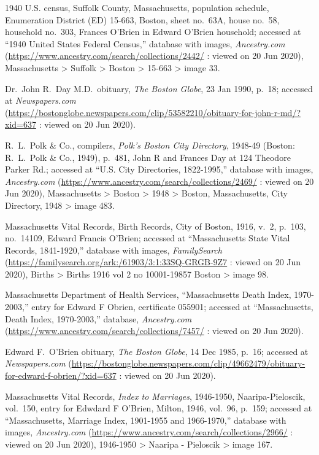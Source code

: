 \begin{thebibliography}{999}
1940 U.S. census, Suffolk County, Massachusetts, population schedule, Enumeration District (ED) 15-663, Boston, sheet no.\ 63A, house no.\ 58, household no.\ 303, Frances O'Brien in Edward O'Brien household; accessed at ``1940 United States Federal Census,'' database with images, \textit{Ancestry.com} (\url{https://www.ancestry.com/search/collections/2442/} : viewed on 20 Jun 2020), Massachusetts > Suffolk > Boston > 15-663 > image 33.

Dr.\ John R.\ Day M.D.\ obituary, \textit{The Boston Globe}, 23 Jan 1990, p.\ 18; accessed at \textit{Newspapers.com} (\url{https://bostonglobe.newspapers.com/clip/53582210/obituary-for-john-r-md/?xid=637} : viewed on 20 Jun 2020).

R.\ L.\ Polk \& Co., compilers, \textit{Polk's Boston City Directory}, 1948-49 (Boston: R.\ L.\ Polk \& Co., 1949), p.\ 481, John R and Frances Day at 124 Theodore Parker Rd.; accessed at ``U.S. City Directories, 1822-1995,'' database with images, \textit{Ancestry.com} (\url{https://www.ancestry.com/search/collections/2469/} : viewed on 20 Jun 2020), Massachusetts > Boston > 1948 > Boston, Massachusetts, City Directory, 1948 > image 483.


Massachusetts Vital Records, Birth Records, City of Boston, 1916, v.\ 2, p.\ 103, no.\ 14109, Edward Francis O'Brien; accessed at ``Massachusetts State Vital Records, 1841-1920,'' database with images, \textit{FamilySearch} (\url{https://familysearch.org/ark:/61903/3:1:33SQ-GRGB-9Z7} : viewed on 20 Jun 2020), Births > Births 1916 vol 2 no 10001-19857 Boston > image 98.

Massachusetts Department of Health Services, ``Massachusetts Death Index, 1970-2003,'' entry for Edward F Obrien, certificate 055901; accessed at ``Massachusetts, Death Index, 1970-2003,'' database, \textit{Ancestry.com} (\url{https://www.ancestry.com/search/collections/7457/} : viewed on 20 Jun 2020).

Edward F.\ O'Brien obituary, \textit{The Boston Globe}, 14 Dec 1985, p.\ 16; accessed at \textit{Newspapers.com} (\url{https://bostonglobe.newspapers.com/clip/49662479/obituary-for-edward-f-obrien/?xid=637} : viewed on 20 Jun 2020).

Massachusetts Vital Records, \textit{Index to Marriages}, 1946-1950, Naaripa-Pieloscik, vol.\ 150, entry for Edwdard F O'Brien, Milton, 1946, vol.\ 96, p.\ 159; accessed at ``Massachusetts, Marriage Index, 1901-1955 and 1966-1970,'' database with images, \textit{Ancestry.com} (\url{https://www.ancestry.com/search/collections/2966/} : viewed on 20 Jun 2020), 1946-1950 > Naaripa - Pieloscik > image 167.


\end{thebibliography}
